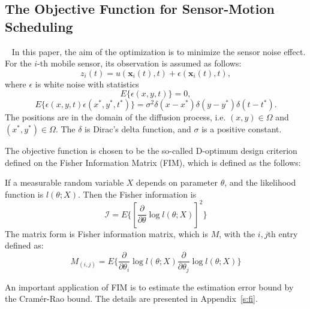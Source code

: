 \subsection{The Objective Function for Sensor-Motion Scheduling}~\label{s:obj}
    In this paper, the aim of the optimization is to minimize the sensor noise effect. For the $i$-th mobile sensor, its observation is assumed as  follows:
    \begin{equation*}\label{e:obsv}
        z_i(t) = u(\mathbf{x}_i(t),t) + \epsilon(\mathbf{x}_i(t),t),
    \end{equation*}
where $\epsilon$ is white   noise with statistics
$$E\{ \epsilon(x,y,t) \} = 0, $$
$$E\{\epsilon(x,y,t) \epsilon(x^\ast,y^\ast,t^\ast)\} = \sigma^2\delta(x - x^\ast) \delta(y -y^\ast)\delta(t-t^\ast).$$
The positions are in the domain of the diffusion process, i.e. $(x,y) \in \Omega$ and $(x^\ast,y^\ast) \in \Omega$.
    The $\delta$ is  Dirac's delta function, and $\sigma$ is a positive constant.


    The objective function  is chosen to be the so-called D-optimum design criterion defined on the Fisher Information Matrix (FIM), which is defined as the follows:

\begin{mdef}\label{d:fisher}
If a measurable random variable $X$ depends on parameter $\theta$, and the likelihood function is $l(\theta;X)$.
Then the Fisher information is
\begin{equation*}
    \mathcal{I}=E\{[\frac{\partial}{\partial \theta} \log l(\theta;X)]^2 \}
\end{equation*}
The matrix form is Fisher information matrix, which is $M$, with the $i,j$th entry defined as:
\begin{equation}\label{e:FIM}
    M_{(i,j)}=E\{\frac{\partial}{\partial \theta_i} \log l(\theta;X) \frac{\partial}{\partial \theta_j} \log l(\theta;X) \}
\end{equation}
\end{mdef}
\begin{remark}
An important application of FIM is to estimate the estimation error bound by the Cram\'{e}r-Rao bound. The details are presented in Appendix~\ref{s:fi}.
\end{remark}

